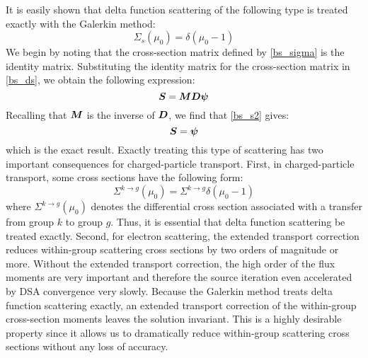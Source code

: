 It is easily shown that delta function scattering of the following type is
treated exactly with the Galerkin method:
\begin{equation}
\Sigma_s(\mu_0) = \delta(\mu_0-1)
\end{equation}
We begin by noting that the cross-section matrix defined by \cref{bs_sigma} 
is the identity matrix. Substituting the identity matrix for the cross-section 
matrix in \cref{bs_ds}, we obtain the following expression:
\begin{equation}
\bs{S} = \bs{MD\psi}
\label{bs_s2}
\end{equation}
Recalling that $\boldsymbol{M}$ is the inverse of $\boldsymbol{D}$, we find that \cref{bs_s2} gives:
\begin{equation}
\boldsymbol{S} = \boldsymbol{\psi}
\end{equation}
which is the exact result. Exactly treating this type of scattering has two
important consequences for charged-particle transport. First, in
charged-particle transport, some cross sections have the following form:
\begin{equation}
\Sigma^{k\rightarrow g}(\mu_0) = \Sigma^{k\rightarrow g} \delta(\mu_0-1)
\end{equation}
where $\Sigma^{k\rightarrow g}(\mu_0)$ denotes the differential cross section
associated with a transfer from group $k$ to group $g$. Thus, it is essential
that delta function scattering be treated exactly. Second, for electron scattering, 
the extended transport correction reduces within-group scattering cross sections by 
two orders of magnitude or more\cite{morel_79}. Without the extended transport
correction, the high order of the flux moments are very important and
therefore the source iteration even accelerated by DSA convergence very
slowly. Because the Galerkin method treats delta
function  scattering exactly, an extended transport correction of the
within-group cross-section moments leaves the solution
invariant\cite{morel_79}. This is a highly desirable property since it allows
us to dramatically reduce within-group scattering cross sections without any
loss of accuracy.


